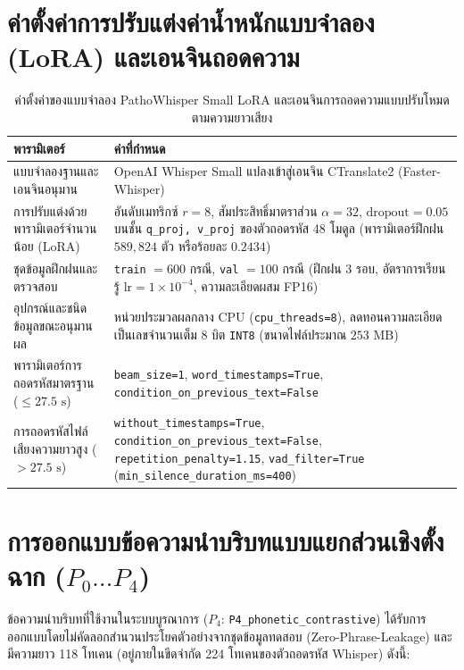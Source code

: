 \section*{ค่าตั้งค่าการปรับแต่งค่าน้ำหนักแบบจำลอง (LoRA) และเอนจินถอดความ}

\begin{table}[H]
\centering
\caption{ค่าตั้งค่าของแบบจำลอง PathoWhisper Small LoRA และเอนจินการถอดความแบบปรับโหมดตามความยาวเสียง}
\label{tab:appconfig}
\small
\begin{tabular}{|l|p{8.2cm}|}
\hline
\textbf{พารามิเตอร์} & \textbf{ค่าที่กำหนด} \\
\hline
แบบจำลองฐานและเอนจินอนุมาน & OpenAI Whisper Small แปลงเข้าสู่เอนจิน CTranslate2 (Faster-Whisper) \\
\hline
การปรับแต่งด้วยพารามิเตอร์จำนวนน้อย (LoRA) & อันดับเมทริกซ์ $r = 8$, สัมประสิทธิ์มาตราส่วน $\alpha = 32$, $\text{dropout} = 0.05$ บนชั้น \texttt{q\_proj, v\_proj} ของตัวถอดรหัส 48 โมดูล (พารามิเตอร์ฝึกฝน $589,824$ ตัว หรือร้อยละ $0.2434$) \\
\hline
ชุดข้อมูลฝึกฝนและตรวจสอบ & \texttt{train} $= 600$ กรณี, \texttt{val} $= 100$ กรณี (ฝึกฝน 3 รอบ, อัตราการเรียนรู้ $\text{lr} = 1 \times 10^{-4}$, ความละเอียดผสม FP16) \\
\hline
อุปกรณ์และชนิดข้อมูลขณะอนุมานผล & หน่วยประมวลผลกลาง CPU (\texttt{cpu\_threads=8}), ลดทอนความละเอียดเป็นเลขจำนวนเต็ม 8 บิต \texttt{INT8} (ขนาดไฟล์ประมาณ $253\text{ MB}$) \\
\hline
พารามิเตอร์การถอดรหัสมาตรฐาน ($\le 27.5\text{ s}$) & \texttt{beam\_size=1}, \texttt{word\_timestamps=True}, \texttt{condition\_on\_previous\_text=False} \\
\hline
การถอดรหัสไฟล์เสียงความยาวสูง ($> 27.5\text{ s}$) & \texttt{without\_timestamps=True}, \texttt{condition\_on\_previous\_text=False}, \texttt{repetition\_penalty=1.15}, \texttt{vad\_filter=True} (\texttt{min\_silence\_duration\_ms=400}) \\
\hline
\end{tabular}
\end{table}

\section*{การออกแบบข้อความนำบริบทแบบแยกส่วนเชิงตั้งฉาก ($P_0 \dots P_4$)}

ข้อความนำบริบทที่ใช้งานในระบบบูรณาการ ($P_4$: \texttt{P4\_phonetic\_contrastive}) ได้รับการออกแบบโดยไม่คัดลอกสำนวนประโยคตัวอย่างจากชุดข้อมูลทดสอบ (Zero-Phrase-Leakage) และมีความยาว 118 โทเคน (อยู่ภายในขีดจำกัด 224 โทเคนของตัวถอดรหัส Whisper) ดังนี้:

